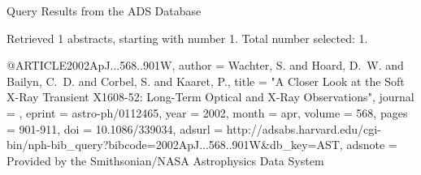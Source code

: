 Query Results from the ADS Database


Retrieved 1 abstracts, starting with number 1.  Total number selected: 1.

@ARTICLE{2002ApJ...568..901W,
   author = {{Wachter}, S. and {Hoard}, D.~W. and {Bailyn}, C.~D. and {Corbel}, S. and 
	{Kaaret}, P.},
    title = "{A Closer Look at the Soft X-Ray Transient X1608-52: Long-Term Optical and X-Ray Observations}",
  journal = {\apj},
   eprint = {astro-ph/0112465},
     year = 2002,
    month = apr,
   volume = 568,
    pages = {901-911},
      doi = {10.1086/339034},
   adsurl = {http://adsabs.harvard.edu/cgi-bin/nph-bib_query?bibcode=2002ApJ...568..901W&db_key=AST},
  adsnote = {Provided by the Smithsonian/NASA Astrophysics Data System}
}


